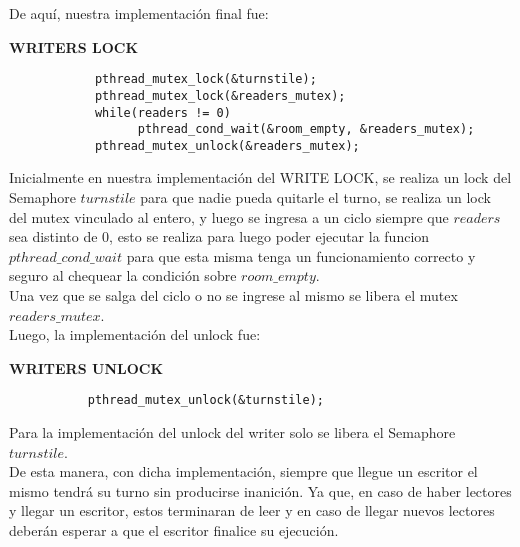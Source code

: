 De aquí, nuestra implementación final fue:\\

\begin{center}
            \textbf{WRITERS LOCK}
\end{center}

 
\begin{verbatim}
            pthread_mutex_lock(&turnstile);
            pthread_mutex_lock(&readers_mutex);
            while(readers != 0)
                  pthread_cond_wait(&room_empty, &readers_mutex);
            pthread_mutex_unlock(&readers_mutex);
\end{verbatim}

Inicialmente en nuestra implementación del WRITE LOCK, se realiza un lock del Semaphore $turnstile$ para que nadie pueda quitarle el turno, se realiza un
lock del mutex vinculado al entero, y luego se ingresa a un ciclo siempre que $readers$ sea distinto de 0, esto se realiza
para luego poder ejecutar la funcion $pthread\_cond\_wait$ para que esta misma tenga un funcionamiento correcto y seguro al
chequear la condición sobre $room\_empty$.\\
Una vez que se salga del ciclo o no se ingrese al mismo se libera el mutex $readers\_mutex$.\\

Luego, la implementación del unlock fue:\\
\begin{center}
           \textbf{WRITERS UNLOCK}
\end{center}

 
\begin{verbatim}
           pthread_mutex_unlock(&turnstile);
\end{verbatim}

Para la implementación del unlock del writer solo se libera el Semaphore $turnstile$.\\

De esta manera, con dicha implementación, siempre que llegue un escritor el mismo tendrá su turno sin producirse inanición.
Ya que, en caso de haber lectores y llegar un escritor, estos terminaran de leer y en caso 
de llegar nuevos lectores deberán esperar a que el escritor finalice su ejecución.\\
